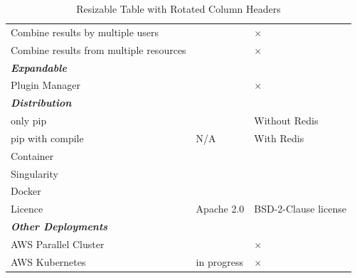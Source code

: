 \documentclass[utf8]{FrontiersinVancouver} %
\newcommand{\YES}{\ding{51}}
\newcommand{\NO}{$\times$}
\begin{document}
\begin{table}[htbp]
{\begin{tabular}{|l|l|l|}
Combine results by multiple users & \YES & \NO \\
Combine results from multiple resources & \YES & \NO \\
\hline
\multicolumn{3}{|l|}{\bf\em Expandable}\\
\hline
Plugin Manager & \YES & \NO \\
\hline
\multicolumn{3}{|l|}{\bf\em Distribution}\\
\hline
only pip & \YES & Without Redis \\
pip with compile & N/A & With Redis \\
Container & \YES & \YES \\
Singularity & \YES & \YES \\
Docker & \YES & \YES \\
Licence  & Apache 2.0 & BSD-2-Clause license \\
\hline
\multicolumn{3}{|l|}{\bf\em Other Deployments}\\
\hline
AWS Parallel Cluster & \YES & \NO \\ 
AWS Kubernetes  & in progress & \NO \\
\hline
\end{tabular}
}
\caption{Resizable Table with Rotated Column Headers}
\end{table}
\end{document}
